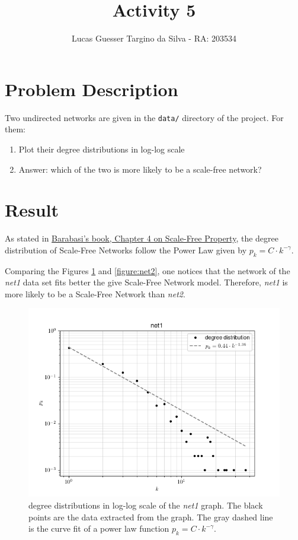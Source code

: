 \documentclass{article}
\title{Activity 5}
\author{Lucas Guesser Targino da Silva - RA: 203534}
\newcommand{\scaleFreeFunction}{\ensuremath{p_k = C \cdot k^{-\gamma}}}
\newcommand{\netDescription}[1]{degree distributions in log-log scale of the \textit{net#1} graph. The black points are the data extracted from the graph. The gray dashed line is the curve fit of a power law function \scaleFreeFunction.}
\begin{document}
\maketitle

\section{Problem Description}

Two undirected networks are given in the \verb|data/| directory of the project. For them:

\begin{enumerate}
    \item Plot their degree distributions in log-log scale
    \item Answer: which of the two is more likely to be a scale-free network?
\end{enumerate}

\section{Result}

As stated in \href{http://networksciencebook.com/chapter/4}{Barabasi's book, Chapter 4 on Scale-Free Property}, the degree distribution of Scale-Free Networks follow the Power Law given by \scaleFreeFunction.

Comparing the Figures \ref{figure:net1} and \ref{figure:net2}, one notices that the network of the \textit{net1} data set fits better the give Scale-Free Network model. Therefore, \textit{net1} is more likely to be a Scale-Free Network than \textit{net2}.

\begin{figure}[!ht]
    \centering
    \includegraphics[width=\textwidth]{../result/net1.png}
    \caption{\netDescription{1}}
    \label{figure:net1}
\end{figure}
\end{document}

